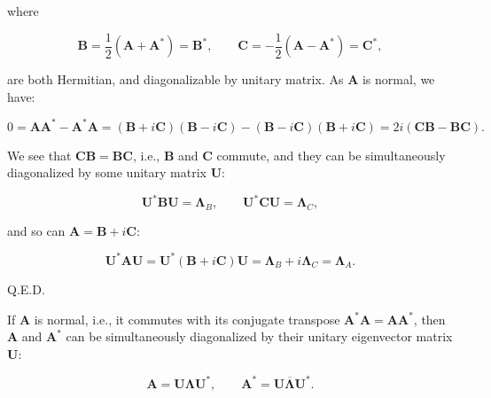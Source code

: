 \documentclass[10pt,b5paper,titlepage]{book}
\begin{document}
\begin{itemize}
        where

        \begin{equation}
            \mathbf{B} = \frac{1}{2}(\mathbf{A} + \mathbf{A}^{*}) = \mathbf{B}^{*}
            , \qquad
            \mathbf{C} = -\frac{1}{2}(\mathbf{A} - \mathbf{A}^{*}) = \mathbf{C}^{*}
        ,\end{equation}

        are both Hermitian, and diagonalizable by unitary matrix. As $\mathbf{A}$
        is normal, we have:

        \begin{equation}
            0 = \mathbf{A}\mathbf{A}^{*} - \mathbf{A}^{*}\mathbf{A}
            = (\mathbf{B} + i \mathbf{C})(\mathbf{B} - i \mathbf{C})
            - (\mathbf{B} - i \mathbf{C})(\mathbf{B} + i \mathbf{C})
            = 2 i (\mathbf{C}\mathbf{B} - \mathbf{B}\mathbf{C})
        .\end{equation}

        We see that $\mathbf{C}\mathbf{B} = \mathbf{B}\mathbf{C}$, i.e.,
        $\mathbf{B}$ and $\mathbf{C}$ commute, and they can be simultaneously
        diagonalized by some unitary matrix $\mathbf{U}$:

        \begin{equation}
            \mathbf{U}^{*}\mathbf{B}\mathbf{U} = \mathbf{\Lambda}_{B}
            , \qquad
            \mathbf{U}^{*}\mathbf{C}\mathbf{U} = \mathbf{\Lambda}_{C}
        ,\end{equation}

        and so can $\mathbf{A} = \mathbf{B} + i \mathbf{C}$:

        \begin{equation}
            \mathbf{U}^{*}\mathbf{A}\mathbf{U}
            = \mathbf{U}^{*}(\mathbf{B} + i \mathbf{C})\mathbf{U}
            = \mathbf{\Lambda}_{B} + i \mathbf{\Lambda}_{C} = \mathbf{\Lambda}_{A}
        .\end{equation}
\end{itemize}

Q.E.D.

If $\mathbf{A}$ is normal, i.e., it commutes with its conjugate transpose
$\mathbf{A}^{*}\mathbf{A} = \mathbf{A}\mathbf{A}^{*}$, then $\mathbf{A}$
and $\mathbf{A}^{*}$ can be simultaneously diagonalized by their unitary eigenvector
matrix $\mathbf{U}$:

\begin{equation}
    \mathbf{A} = \mathbf{U}\mathbf{\Lambda}\mathbf{U}^{*}
    , \qquad
    \mathbf{A}^{*} = \mathbf{U}\overline{\mathbf{\Lambda}}\mathbf{U}^{*}
.\end{equation}
\end{document}
